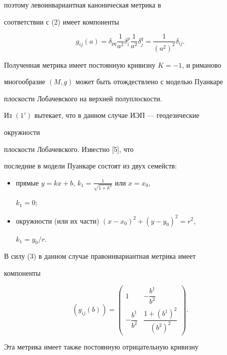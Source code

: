 поэтому левоинвариантная каноническая метрика в 


соответствии с (2) имеет компоненты 


$$ 


g_{i j}(a)=\delta_{p q}\frac{1}{a^2} 


\delta^p_i\frac{1}{a^2}\delta^q_j= 


\frac{1}{(a^2)^2}\delta_{i j}. 


$$ 


Полученная метрика имеет постоянную кривизну $K=-1$, и риманово 


многообразие $(M,g)$ может быть отождествлено с моделью Пуанкаре 


плоскости Лобачевского на верхней полуплоскости. 


Из $(1')$ вытекает, что в данном случае ИЭП --- геодезические 


окружности 


плоскости Лобачевского. Известно [5], что 


последние в модели Пуанкаре состоят из двух семейств: 


\begin{itemize} 


\item[1.] прямые $y=k x+b$, $k_1=\frac{1}{\sqrt{1+k^2}}$ или $x=x_0$, 


$k_1=0$; 


\item[2.] окружности (или их части) $(x-x_0)^2+(y-y_0)^2=r^2$, 


$k_1=y_0/r$. 


\end{itemize} 


\noindent{}В силу (3) в данном случае правоинвариантная метрика имеет 


компоненты 


$$ 


(g_{i j}(b))= 


\begin{pmatrix} 


1 & - \dfrac{b^1}{b^2}\\[3mm] 


-\dfrac{b^1}{b^2} & \dfrac{1+(b^1)^2}{(b^2)^2} 


\end{pmatrix} 


. 


$$ 


Эта метрика имеет также постоянную отрицательную кривизну 


